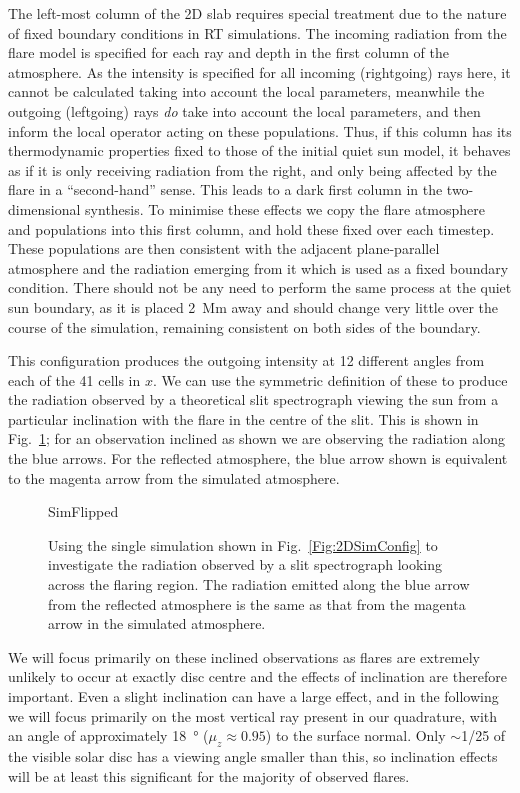 The left-most column of the 2D slab requires special treatment due to the nature of fixed boundary conditions in RT simulations.
The incoming radiation from the flare model is specified for each ray and depth in the first column of the atmosphere.
As the intensity is specified for all incoming (rightgoing) rays here, it cannot be calculated taking into account the local parameters, meanwhile the outgoing (leftgoing) rays \emph{do} take into account the local parameters, and then inform the local operator acting on these populations.
Thus, if this column has its thermodynamic properties fixed to those of the initial quiet sun model, it behaves as if it is only receiving radiation from the right, and only being affected by the flare in a ``second-hand'' sense.
This leads to a dark first column in the two-dimensional synthesis.
To minimise these effects we copy the flare atmosphere and populations into this first column, and hold these fixed over each timestep.
These populations are then consistent with the adjacent plane-parallel atmosphere and the radiation emerging from it which is used as a fixed boundary condition.
There should not be any need to perform the same process at the quiet sun boundary, as it is placed \SI{2}{\mega\metre} away and should change very little over the course of the simulation, remaining consistent on both sides of the boundary.

This configuration produces the outgoing intensity at 12 different angles from each of the 41 cells in $x$.
We can use the symmetric definition of these to produce the radiation observed by a theoretical slit spectrograph viewing the sun from a particular inclination with the flare in the centre of the slit.
This is shown in Fig.~\ref{Fig:2DSimFlipped}; for an observation inclined as shown we are observing the radiation along the blue arrows.
For the reflected atmosphere, the blue arrow shown is equivalent to the magenta arrow from the simulated atmosphere.

\begin{figure}
\centering
{SimFlipped}
\caption{Using the single simulation shown in Fig.~\ref{Fig:2DSimConfig} to investigate the radiation observed by a slit spectrograph looking across the flaring region. The radiation emitted along the blue arrow from the reflected atmosphere is the same as that from the magenta arrow in the simulated atmosphere.}
\label{Fig:2DSimFlipped}
\end{figure}

We will focus primarily on these inclined observations as flares are extremely unlikely to occur at exactly disc centre and the effects of inclination are therefore important.
Even a slight inclination can have a large effect, and in the following we will focus primarily on the most vertical ray present in our quadrature, with an angle of approximately \SI{18}{\degree} ($\mu_z\approx0.95$) to the surface normal.
Only $\sim$1/25 of the visible solar disc has a viewing angle smaller than this, so inclination effects will be at least this significant for the majority of observed flares.

